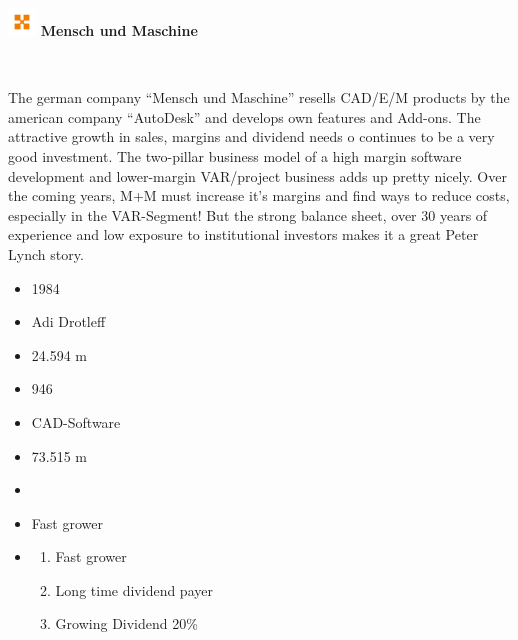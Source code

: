 \documentclass[11pt]{scrartcl}
\begin{document}



\begin{minipage}{\textwidth}
    \center\includegraphics[width=2em]{company_logo.png}
    {\textbf{Mensch und Maschine}}
\end{minipage}\\




\begin{minipage}[t]{0,72\linewidth}
    The german company \enquote{Mensch und Maschine} resells CAD/E/M
    products by the american company \enquote{AutoDesk} and develops
    own features and Add-ons. The attractive growth in sales, margins
    and dividend needs o continues to be a very good investment. The
    two-pillar business model of a high margin software development and
    lower-margin VAR/project business adds up pretty nicely. Over the
    coming years, M+M must increase it's margins and find ways to reduce
    costs, especially in the VAR-Segment! But the strong balance sheet,
    over 30 years of experience and low exposure to institutional investors
    makes it a great Peter Lynch story.
\end{minipage}\hfill
\begin{minipage}[t]{0,25\linewidth}
    \begin{itemize}[align=center]\scriptsize
        \item [\faAsterisk] 1984
        \item [\faMale] Adi Drotleff
        \item [\faEuro] \faEuro \num{24.594} m
        \item [\faUsers] \num{946}
        \item [\faIndustry] CAD-Software
        \item [\faBook] \faEuro \num{73,515} m
        \item [\reflectbox{\rotatebox[origin=c]{270}{\faLevelDown}}] \faEuro
        \item [\faFolderOpen]Fast grower
        \item [\faQuestion]
        \begin{enumerate}[align=left]
            \item Fast grower
            \item Long time dividend payer
            \item Growing Dividend 20\%
        \end{enumerate}
    \end{itemize}
\end{minipage}\\\\
\end{document}
